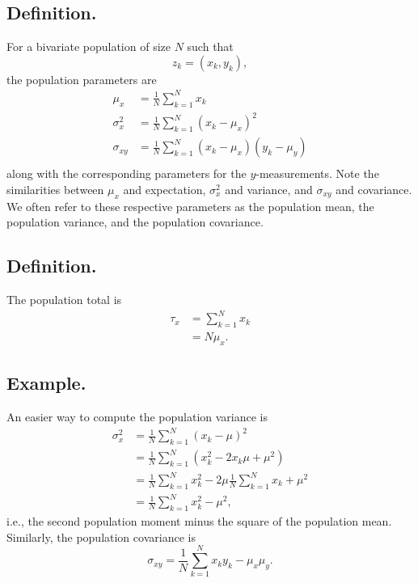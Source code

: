 \documentclass[titlepage]{article}
\begin{document}
\subsection{Definition.} For a bivariate population of size $N$ such that 
$$z_{k} = (x_{k}, y_{k}),$$
the population parameters are 
\begin{align*}
           \mu_{x} &= \frac{1}{N}\sum_{k=1}^{N}x_{k} \\
    \sigma_{x}^{2} &= \frac{1}{N}\sum_{k=1}^{N}(x_{k} - \mu_{x})^{2} \\
       \sigma_{xy} &= \frac{1}{N}\sum_{k=1}^{N}(x_{k} - \mu_{x})(y_{k} - \mu_{y}) \\
\end{align*}
along with the corresponding parameters for the $y$-measurements. Note the similarities between $\mu_{x}$ and expectation, $\sigma_{x}^{2}$ and variance, and $\sigma_{xy}$ and covariance. We often refer to these respective parameters as the population mean, the population variance, and the population covariance.

\subsection{Definition.} The population total is 
\begin{align*}
    \tau_{x} &= \sum_{k=1}^{N}x_{k} \\
             &= N\mu_{x}.
\end{align*}

\subsection{Example.} An easier way to compute the population variance is
\begin{align*}
    \sigma_{x}^{2} &= \frac{1}{N}\sum_{k=1}^{N}(x_{k} - \mu)^{2} \\
                   &= \frac{1}{N}\sum_{k=1}^{N}\left(x_{k}^{2} - 2x_{k}\mu + \mu^{2}\right) \\
                   &= \frac{1}{N}\sum_{k=1}^{N}x_{k}^{2} - 2\mu\frac{1}{N}\sum_{k=1}^{N}x_{k} + \mu^{2} \\
                   &= \frac{1}{N}\sum_{k=1}^{N}x_{k}^{2} -\mu^{2},
\end{align*}
i.e., the second population moment minus the square of the population mean. Similarly, the population covariance is 
$$\sigma_{xy} = \frac{1}{N}\sum_{k=1}^{N}x_{k}y_{k} - \mu_{x}\mu_{y}.$$
\end{document}
